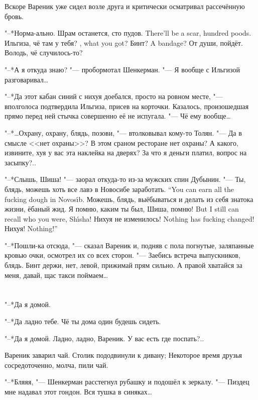 Вскоре Вареник уже сидел возле друга и критически осматривал рассечённую бровь.

"--*Норма-ально.
{Шрам останется, сто пудов.}
{There'll be a scar, hundred poods.}
{Ильгиза, чё там у тебя?}
{\Ilgiza, what you got?}
{Бинт?}
{A bandage?}
От души, пойдёт.
Володь, чё случилось-то?

"--*А я откуда знаю? "--- пробормотал Шенкерман.
"--- Я вообще с Ильгизой разговаривал\ldots{}

"--*Да этот кабан синий с нихуя доебался, просто на ровном месте, "--- вполголоса подтвердила Ильгиза, присев на корточки.
Казалось, произошедшая прямо перед ней стычка совершенно её не испугала.
"--- Чё ему вообще\ldots{}

"--*\ldots{}Охрану, охрану, блядь, позови, "--- втолковывал кому-то Толян.
"--- Да в смысле <<нет охраны>>?
В этом сраном ресторане нет охраны?
А какого, извините, хуя у вас эта наклейка на дверях?
За что я деньги платил, вопрос на засыпку?..

"--*Слышь, Шиша! "--- заорал откуда-то из-за мужских спин Дубынин.
{"--- Ты, блядь, можешь хоть все лавэ в Новосибе заработать.}
{``You can earn all the fucking dough in Novos\'{\i}b.}
Можешь, блядь, выёбываться и делать из себя знатока жизни, ёбаный жид.
{Я помню, каким ты был, Шиша, помню!}
{But I still can recall who you were, Sh\'{\i}sha!}
{Нихуя не изменилось!}
{Nothing has fucking changed!}
{Нихуя!}
{Nothing!''}

"--*Пошли-ка отсюда, "--- сказал Вареник и, подняв с пола погнутые, заляпанные кровью очки, осмотрел их со всех сторон.
"--- Заебись встреча выпускников, блядь.
Бинт держи, нет, левой, прижимай прям сильно.
А правой хватайся за меня, давай, щас такси поймаем\ldots{}

\chapter{}

\label{Sun_2012_07_22}

"--*Да я домой.

"--*Да ладно тебе.
Чё ты дома один будешь сидеть.

"--*Да я домой.
Ладно, ладно, Вареник.
У вас есть где поспать?..

Вареник заварил чай.
Столик пододвинули к дивану;
Некоторое время друзья сосредоточенно, молча, пили чай.

"--*Бляяя, "--- Шенкерман расстегнул рубашку и подошёл к зеркалу.
"--- Пиздец мне надавал этот гондон.
Вся тушка в синяках\ldots{}

